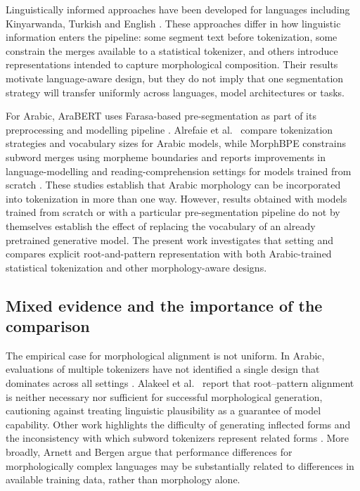 \documentclass[a4paper,fleqn]{cas-sc}
\begin{document}
Linguistically informed approaches have been developed for languages including Kinyarwanda, Turkish and English \citep{nzeyimana2022kinyabert,toraman2023impact,jabbar2023morphpiece,bauwens2024bpe,libovicky2024lexically}. These approaches differ in how linguistic information enters the pipeline: some segment text before tokenization, some constrain the merges available to a statistical tokenizer, and others introduce representations intended to capture morphological composition. Their results motivate language-aware design, but they do not imply that one segmentation strategy will transfer uniformly across languages, model architectures or tasks.

For Arabic, AraBERT uses Farasa-based pre-segmentation as part of its preprocessing and modelling pipeline \citep{antoun2020arabert}. Alrefaie et al.\ \citep{alrefaie2024exploring} compare tokenization strategies and vocabulary sizes for Arabic models, while MorphBPE constrains subword merges using morpheme boundaries and reports improvements in language-modelling and reading-comprehension settings for models trained from scratch \citep{asgari2025morphbpe,asgari2026morphbpe}. These studies establish that Arabic morphology can be incorporated into tokenization in more than one way. However, results obtained with models trained from scratch or with a particular pre-segmentation pipeline do not by themselves establish the effect of replacing the vocabulary of an already pretrained generative model. The present work investigates that setting and compares explicit root-and-pattern representation with both Arabic-trained statistical tokenization and other morphology-aware designs.

\subsection{Mixed evidence and the importance of the comparison}
\label{sec:related:against}

The empirical case for morphological alignment is not uniform. In Arabic, evaluations of multiple tokenizers have not identified a single design that dominates across all settings \citep{alyafeai2023evaluating}. Alakeel et al.\ \citep{alakeel2026morphemes} report that root--pattern alignment is neither necessary nor sufficient for successful morphological generation, cautioning against treating linguistic plausibility as a guarantee of model capability. Other work highlights the difficulty of generating inflected forms and the inconsistency with which subword tokenizers represent related forms \citep{reda2026yallamorph,dimarco2024subword}. More broadly, Arnett and Bergen \citep{arnett2025why} argue that performance differences for morphologically complex languages may be substantially related to differences in available training data, rather than morphology alone.
\end{document}
